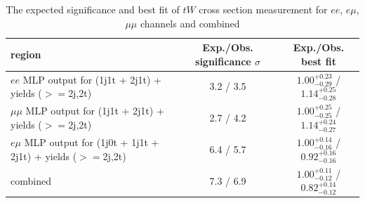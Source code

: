 \begin{table}[]
\centering
\caption{The expected significance and best fit of $tW$ cross section measurement for $ee$, $e\mu$, $\mu\mu$ channels and combined}
\label{tab:tW_results}
\begin{tabular}{|l|c|c|}
\hline
region                                                          & Exp./Obs. significance $\sigma$      & Exp./Obs. best fit                              \\ \hline
$ee$ MLP output for (1j1t + 2j1t) + yields ($>=$2j,2t)          & 3.2 / 3.5                            & $1.00^{+0.23}_{-0.29}$ / $1.14^{+0.25}_{-0.28}$ \\ \hline
$\mu\mu$ MLP output for (1j1t + 2j1t) + yields ($>=$2j,2t)      & 2.7 / 4.2                            & $1.00^{+0.25}_{-0.25}$ / $1.14^{+0.24}_{-0.27}$ \\ \hline
$e\mu$ MLP output for (1j0t + 1j1t + 2j1t) + yields ($>=$2j,2t) & 6.4 / 5.7                            & $1.00^{+0.14}_{-0.16}$ / $0.92^{+0.16}_{-0.16}$ \\ \hline
combined                                                        & 7.3 / 6.9                            & $1.00^{+0.11}_{-0.12}$ / $0.82^{+0.14}_{-0.12}$ \\ \hline
\end{tabular}
\end{table}




